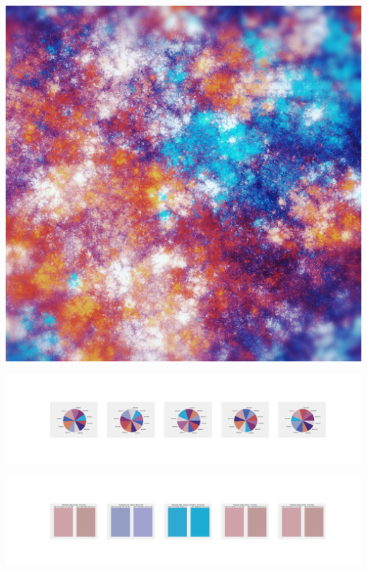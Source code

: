 \documentclass[11pt]{article}
\begin{document}
\begin{landscape}
    \begin{center}
    \includegraphics[width=\textwidth]{./nbimg/file (178).jpg}
    \end{center}

    \begin{center}
    \includegraphics[width=250mm]{./nbimg/pie-87.jpg}
    \end{center}

    \begin{center}
    \includegraphics[width=250mm]{./nbimg/peak-87.jpg}
    \end{center}
    


\end{landscape}
\end{document}
